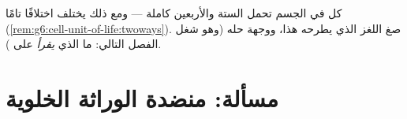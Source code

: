 \begin{exercise}[$\star\star\star$]\label{exo:g9:chromosomes:12}
كل  في الجسم تحمل  الستة والأربعين كاملة ---
ومع ذلك يختلف    اختلافًا تامًا
(\cref{rem:g6:cell-unit-of-life:twoways}). صغ اللغز الذي
يطرحه هذا، ووجهة حله (وهو شغل الفصل التالي: ما الذي
\emph{يقرأ} على ).
\end{exercise}

\section{مسألة: منضدة الوراثة الخلوية}

